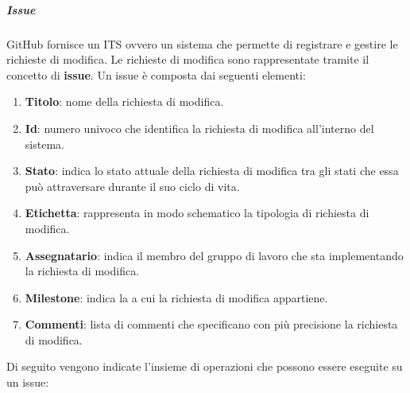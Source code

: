 \subparagraph{Issue}
\label{subpar:ITS}
GitHub fornisce un ITS ovvero un sistema che permette di registrare e gestire le richieste di modifica.
Le richieste di modifica sono rappresentate tramite il concetto di \textbf{issue}.
Un issue è composta dai seguenti elementi:
\begin{enumerate}
    \item \textbf{Titolo}: nome della richiesta di modifica.
    
    \item \textbf{Id}: numero univoco che identifica la richiesta di modifica all'interno del sistema.
    
    \item \textbf{Stato}: indica lo stato attuale della richiesta di modifica tra gli stati che essa può attraversare durante il suo ciclo di vita.
    
    \item \textbf{Etichetta}: rappresenta in modo schematico la tipologia di richiesta di modifica.
    
    \item \textbf{Assegnatario}: indica il membro del gruppo di lavoro che sta implementando la richiesta di modifica.
    
    \item \textbf{Milestone}: indica la  a cui la richiesta di modifica appartiene.
    
    \item \textbf{Commenti}: lista di commenti che specificano con più precisione la richiesta di modifica. 
\end{enumerate}
Di seguito vengono indicate l'insieme di operazioni che possono essere eseguite su un issue:
